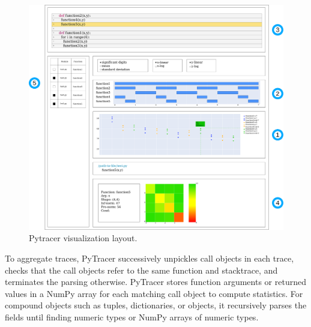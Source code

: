 \documentclass[11pt]{article}
\newcommand{\pytracer}[0]{PyTracer\xspace}
\begin{document}
\begin{figure}
    \centering
    \includegraphics[width=\textwidth]{figure/pytracer_layout.pdf}
    \caption{Pytracer visualization layout.}
    \label{fig:visu-layout}
\end{figure}


To aggregate traces, \pytracer successively unpickles call objects in each trace, checks
that the call objects refer to the same function and stacktrace, and terminates the parsing otherwise.
PyTracer stores function arguments or returned values in a NumPy array for each matching call object to compute statistics.
For compound objects such as tuples, dictionaries, or objects, it recursively parses the fields until finding
numeric types or NumPy arrays of numeric types.
\end{document}
